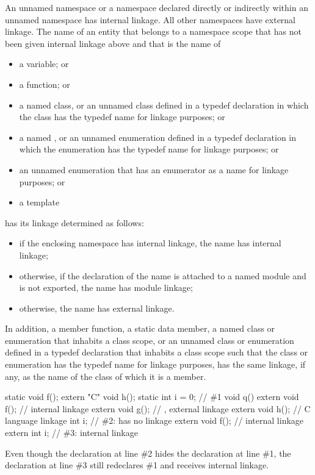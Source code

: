 \pnum
An unnamed namespace or a namespace declared directly or indirectly within an
unnamed namespace has internal linkage. All other namespaces have external linkage.
The name of an entity that belongs to a namespace scope
that has not been given internal linkage above
and that is the name of
\begin{itemize}
\item a variable; or
\item a function; or
\item
{}%
a named class, or an unnamed class defined in a
typedef declaration in which the class has the typedef name for linkage
purposes; or
\item
{}%
a named , or an unnamed enumeration defined
in a typedef declaration in which the enumeration has the typedef name
for linkage purposes; or
\item an unnamed enumeration
that has an enumerator as a name for linkage purposes; or
\item a template
\end{itemize}
has its linkage determined as follows:
\begin{itemize}
\item
if the enclosing namespace has internal linkage,
the name has internal linkage;
\item
otherwise,
if the declaration of the name is
attached to a named module
and is not exported,
the name has module linkage;
\item
otherwise,
the name has external linkage.
\end{itemize}

\pnum
In addition,
a member function,
a static data member,
a named class or enumeration that inhabits a class scope, or
an unnamed class or enumeration defined in a typedef declaration
that inhabits a class scope
such that the class or enumeration
has the typedef name for linkage purposes,
has the same linkage, if any, as the name of the class of which it is a member.

\pnum
\begin{example}
\begin{codeblock}
static void f();
extern "C" void h();
static int i = 0;               // \#1
void q() {
  extern void f();              // internal linkage
  extern void g();              // , external linkage
  extern void h();              // C language linkage
  int i;                        // \#2:  has no linkage
  {
    extern void f();            // internal linkage
    extern int i;               // \#3: internal linkage
  }
}
\end{codeblock}
Even though the declaration at line \#2 hides the declaration at line \#1,
the declaration at line \#3 still redeclares \#1 and receives internal linkage.
\end{example}

